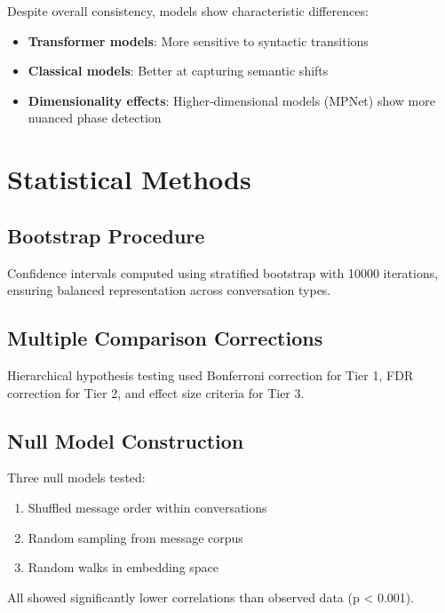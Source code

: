 \documentclass[11pt,letterpaper]{article}
\newcommand{\bootstrapIterations}{10000}
\newcommand{\nullModelPValue}{0.001}
\begin{document}
Despite overall consistency, models show characteristic differences:

\begin{itemize}
\item \textbf{Transformer models}: More sensitive to syntactic transitions
\item \textbf{Classical models}: Better at capturing semantic shifts
\item \textbf{Dimensionality effects}: Higher-dimensional models (MPNet) show more nuanced phase detection
\end{itemize}

\section{Statistical Methods}

\subsection{Bootstrap Procedure}

Confidence intervals computed using stratified bootstrap with \bootstrapIterations{} iterations, ensuring balanced representation across conversation types.

\subsection{Multiple Comparison Corrections}

Hierarchical hypothesis testing used Bonferroni correction for Tier 1, FDR correction for Tier 2, and effect size criteria for Tier 3.

\subsection{Null Model Construction}

Three null models tested:
\begin{enumerate}
\item Shuffled message order within conversations
\item Random sampling from message corpus
\item Random walks in embedding space
\end{enumerate}

All showed significantly lower correlations than observed data (p < \nullModelPValue{}).
\end{document}
